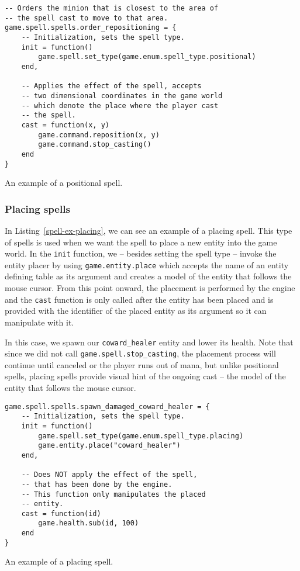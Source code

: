 \begin{listing}[H]
    \centering
    \begin{lstlisting}
-- Orders the minion that is closest to the area of
-- the spell cast to move to that area.
game.spell.spells.order_repositioning = {
    -- Initialization, sets the spell type.
    init = function()
        game.spell.set_type(game.enum.spell_type.positional)
    end,

    -- Applies the effect of the spell, accepts
    -- two dimensional coordinates in the game world
    -- which denote the place where the player cast
    -- the spell.
    cast = function(x, y)
        game.command.reposition(x, y)
        game.command.stop_casting()
    end
}
    \end{lstlisting}
    \caption{An example of a positional spell.}
    \label{spell-ex-positional}
\end{listing}

\subsubsection{Placing spells}

In Listing~\ref{spell-ex-placing}, we can see an example of a placing spell. This type of spells is used when we want the spell to place a
new entity into the game world. In the \texttt{init} function, we -- besides setting the spell type -- invoke the entity placer by using
\texttt{game.entity.place} which accepts the name of an entity defining table as its argument and creates a model of the entity that follows
the mouse cursor. From this point onward, the placement is
performed by the engine and the \texttt{cast} function is only called after the entity has been placed and is provided with the identifier
of the placed entity as its argument so it can manipulate with it.

In this case, we spawn our \texttt{coward\_healer} entity and lower its health. Note that since we did not call
\texttt{game.spell.stop\_casting}, the placement process will continue until canceled or the player runs out of mana, but unlike positional
spells, placing spells provide visual hint of the ongoing cast -- the model of the entity that follows the mouse cursor.

\begin{listing}
    \centering
    \begin{lstlisting}
game.spell.spells.spawn_damaged_coward_healer = {
    -- Initialization, sets the spell type.
    init = function()
        game.spell.set_type(game.enum.spell_type.placing)
        game.entity.place("coward_healer")
    end,

    -- Does NOT apply the effect of the spell,
    -- that has been done by the engine.
    -- This function only manipulates the placed
    -- entity.
    cast = function(id)
        game.health.sub(id, 100)
    end
}
    \end{lstlisting}
    \caption{An example of a placing spell.}
    \label{spell-ex-placing}
\end{listing}

